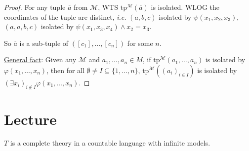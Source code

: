 \documentclass[]{article}
\theoremstyle{custhm}
\theoremstyle{cusdef}
\theoremstyle{custhm}
\theoremstyle{custhm}
\theoremstyle{custhm}
\theoremstyle{ex}
\theoremstyle{custhm}
\theoremstyle{cusdef}
\theoremstyle{remark}
\theoremstyle{remark}
\theoremstyle{numremark}
\renewcommand{\it}[1]{\textit{#1}}
\newcommand{\M}{\mathcal{M}}
\renewcommand{\phi}{\varphi}
\renewcommand{\bar}{\overline}
\newcommand{\tp}{\textrm{tp}}
\renewcommand{\subset}{\subseteq}
\begin{document}
\begin{proof}
For any tuple $\bar{a}$ from $\M$, WTS $\tp^\M(\bar{a})$ is isolated. WLOG the coordinates of the tuple are distinct, \it{i.e.} $(a,b,c)$ isolated by $\psi(x_1,x_2,x_3)$, $(a,a,b,c)$ isolated by $\psi(x_1,x_3,x_4)\land x_2 = x_3$.

So $\bar{a}$ is a sub-tuple of $([c_1],\dots,[c_n])$ for some $n$.

\underline{General fact}: Given any $\M$ and $a_1,\dots,a_n\in M$, if $\tp^\M(a_1,\dots,a_n)$ is isolated by $\phi(x_1,\dots,x_n)$, then for all $\emptyset\ne I\subset \{1,\dots,n\}$, $\tp^\M((a_i)_{i\in I})$ is isolated by $(\exists x_i)_{i\not\in I}\phi(x_1,\dots,x_n)$.
\end{proof}

\section{Lecture}
$T$ is a complete theory in a countable language with infinite models.
\end{document}
